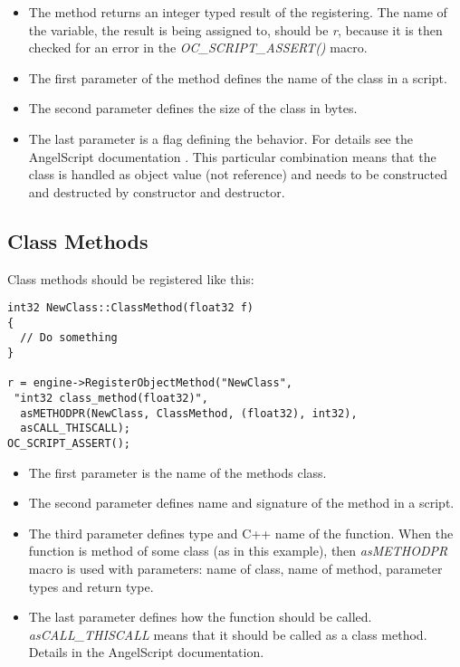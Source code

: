\documentclass[a4paper, 12pt]{report}
\begin{document}
\begin{itemize}
\item
The method returns an integer typed result of the registering. The name of the variable, the result is being assigned to, should be \emph{r}, because it is then checked for an error in the \emph{OC\_SCRIPT\_ASSERT()} macro.

\item
The first parameter of the method defines the name of the class in a script.

\item
The second parameter defines the size of the class in bytes.

\item
The last parameter is a flag defining the behavior. For details see the AngelScript documentation \cite{angelscript}. This particular combination means that the class is handled as object value (not reference) and needs to be constructed and destructed by constructor and destructor.
\end{itemize}

\subsection{Class Methods}
Class methods should be registered like this:

\footnotesize 
\begin{verbatim}
int32 NewClass::ClassMethod(float32 f)
{
  // Do something
}

r = engine->RegisterObjectMethod("NewClass",
 "int32 class_method(float32)", 
  asMETHODPR(NewClass, ClassMethod, (float32), int32),
  asCALL_THISCALL);
OC_SCRIPT_ASSERT();
\end{verbatim}
\normalsize

\begin{itemize}
\item
The first parameter is the name of the methods class.
\item
The second parameter defines name and signature of the method in a script.
\item
The third parameter defines type and C++ name of the function. When the function is method of some class (as in this example), then \emph{asMETHODPR} macro is used with parameters: name of class, name of method, parameter types and return type.
\item
The last parameter defines how the function should be called. \emph{asCALL\_THISCALL} means that it should be called as a class method. Details in the AngelScript documentation\cite{angelscript}.
\end{itemize}
\end{document}
